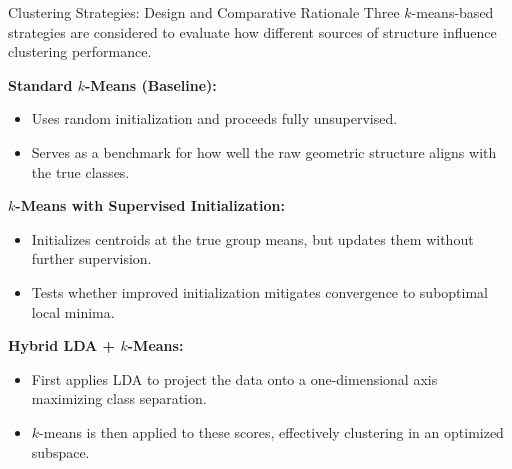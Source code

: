 \documentclass[8pt, aspectratio=169]{beamer}
\begin{document}
\begin{frame}{Clustering Strategies: Design and Comparative Rationale}
\small
Three $k$-means-based strategies are considered to evaluate how different sources of structure influence clustering performance.

\vspace{0.5em}
\textbf{Standard $k$-Means (Baseline):}
\begin{itemize}
    \item Uses random initialization and proceeds fully unsupervised.
    \item Serves as a benchmark for how well the raw geometric structure aligns with the true classes.
\end{itemize}

\vspace{0.5em}
\textbf{$k$-Means with Supervised Initialization:}
\begin{itemize}
    \item Initializes centroids at the true group means, but updates them without further supervision.
    \item Tests whether improved initialization mitigates convergence to suboptimal local minima.
\end{itemize}

\vspace{0.5em}
\textbf{Hybrid LDA + $k$-Means:}
\begin{itemize}
    \item First applies LDA to project the data onto a one-dimensional axis maximizing class separation.
    \item $k$-means is then applied to these scores, effectively clustering in an optimized subspace.
\end{itemize}
\end{frame}
\end{document}
